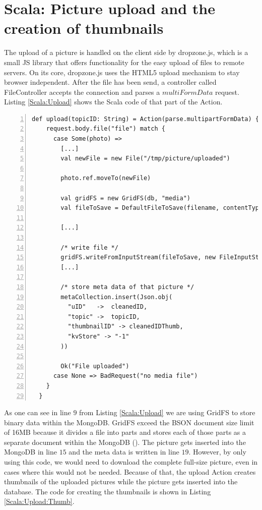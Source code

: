 \section{Scala: Picture upload and the creation of thumbnails}
The upload of a picture is handled on the client side by dropzone.js, which is a small \ac{JS} library that offers functionality for the easy upload of files to remote servers. On its core, dropzone.js uses the \ac{HTML5} upload mechanism to stay browser independent. After the file has been send, a controller called FileController accepts the connection and parses a $multiFormData$ request. Listing \ref{Scala:Upload} shows the Scala code of that part of the Action.

\begin{lstlisting}[numbers=left,caption={Snippet of the upload Action of the FileController for uploading pictures},label=Scala:Upload,frame=tlbr,breaklines]
def upload(topicID: String) = Action(parse.multipartFormData) { request =>
    request.body.file("file") match {
      case Some(photo) =>
        [...]
        val newFile = new File("/tmp/picture/uploaded")

        photo.ref.moveTo(newFile)

        val gridFS = new GridFS(db, "media")
        val fileToSave = DefaultFileToSave(filename, contentType)

        [...]

        /* write file */
        gridFS.writeFromInputStream(fileToSave, new FileInputStream(newFile))
        [...]

        /* store meta data of that picture */
        metaCollection.insert(Json.obj(
          "uID"   ->  cleanedID,
          "topic" ->  topicID,
          "thumbnailID" -> cleanedIDThumb,
          "kvStore" -> "-1"
        ))

        Ok("File uploaded")
      case None => BadRequest("no media file")
    }
  }
\end{lstlisting}

As one can see in line $9$ from Listing \ref{Scala:Upload} we are using GridFS to store binary data within the MongoDB. GridFS exceed the \ac{BSON} document size limit of 16MB because it divides a file into parts and stores each of those parts as a separate document within the MongoDB (\cite{gridfs}). The picture gets inserted into the MongoDB in line $15$ and the meta data is written in line $19$. However, by only using this code, we would need to download the complete full-size picture, even in cases where this would not be needed.  Because of that, the upload Action creates thumbnails of the uploaded pictures while the picture gets inserted into the database. The code for creating the thumbnails is shown in Listing \ref{Scala:Upload:Thumb}.


